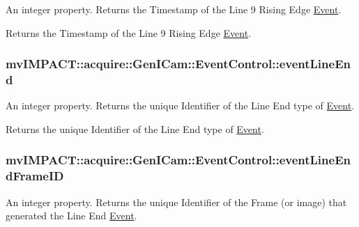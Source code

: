 An integer property. Returns the Timestamp of the Line 9 Rising Edge \hyperlink{classmv_i_m_p_a_c_t_1_1acquire_1_1_event}{Event}. 

Returns the Timestamp of the Line 9 Rising Edge \hyperlink{classmv_i_m_p_a_c_t_1_1acquire_1_1_event}{Event}. \hypertarget{classmv_i_m_p_a_c_t_1_1acquire_1_1_gen_i_cam_1_1_event_control_ac5d881c32b4b809d1082414467c9af1f}{
\subsubsection[{event\+Line\+End}]{ mv\+I\+M\+P\+A\+C\+T\+::acquire\+::\+Gen\+I\+Cam\+::\+Event\+Control\+::event\+Line\+End}}\label{classmv_i_m_p_a_c_t_1_1acquire_1_1_gen_i_cam_1_1_event_control_ac5d881c32b4b809d1082414467c9af1f}


An integer property. Returns the unique Identifier of the Line End type of \hyperlink{classmv_i_m_p_a_c_t_1_1acquire_1_1_event}{Event}. 

Returns the unique Identifier of the Line End type of \hyperlink{classmv_i_m_p_a_c_t_1_1acquire_1_1_event}{Event}. \hypertarget{classmv_i_m_p_a_c_t_1_1acquire_1_1_gen_i_cam_1_1_event_control_ab5f6f3f653b4954acae2f548de0a6543}{
\subsubsection[{event\+Line\+End\+Frame\+I\+D}]{ mv\+I\+M\+P\+A\+C\+T\+::acquire\+::\+Gen\+I\+Cam\+::\+Event\+Control\+::event\+Line\+End\+Frame\+I\+D}}\label{classmv_i_m_p_a_c_t_1_1acquire_1_1_gen_i_cam_1_1_event_control_ab5f6f3f653b4954acae2f548de0a6543}


An integer property. Returns the unique Identifier of the Frame (or image) that generated the Line End \hyperlink{classmv_i_m_p_a_c_t_1_1acquire_1_1_event}{Event}. 

